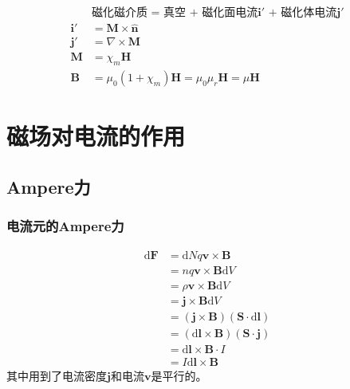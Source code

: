\documentclass[12pt,onecolumn,a4paper]{book}
\newenvironment{block}[1]{
    \begin{tcolorbox}[colback=blue!5!white,colframe=blue!75!black,title=#1]
}{
    \end{tcolorbox}
}
\numberwithin{table}{subsection}
\numberwithin{equation}{subsection}
\begin{document}
\begin{block}{磁介质}
    \begin{align}
                    & \text{磁化磁介质 = 真空 + 磁化面电流$\mathbf{i}'$ + 磁化体电流$\mathbf{j}'$}             \\
        \mathbf{i}' & = \mathbf{M} \times \hat{\mathbf{n}}                                    \\
        \mathbf{j}' & = \nabla \times \mathbf{M}                                              \\
        \mathbf{M}  & = \chi_m \mathbf{H}                                                     \\
        \mathbf{B}  & = \mu_0 (1+\chi_m) \mathbf{H} = \mu_0 \mu_r \mathbf{H} = \mu \mathbf{H}
    \end{align}
\end{block}

\newpage

\section{磁场对电流的作用}

\subsection{Ampere力}

\subsubsection{电流元的Ampere力}

\begin{align}
    \mathrm{d} \mathbf{F} & = \mathrm{d} N q \mathbf{v} \times \mathbf{B}                             \\
                          & =  n q \mathbf{v} \times \mathbf{B} \mathrm{d} V                          \\
                          & = \rho \mathbf{v} \times \mathbf{B} \mathrm{d} V                          \\
                          & = \mathbf{j} \times \mathbf{B} \mathrm{d} V                               \\
                          & = (\mathbf{j} \times \mathbf{B})( \mathbf{S} \cdot \mathrm{d} \mathbf{l}) \\
                          & = (\mathrm{d} \mathbf{l} \times \mathbf{B})  (\mathbf{S}\cdot \mathbf{j}) \\
                          & = \mathrm{d} \mathbf{l} \times \mathbf{B}\cdot I                          \\
                          & = I \mathrm{d} \mathbf{l} \times \mathbf{B}
\end{align}
其中用到了电流密度$\mathbf{j}$和电流$ \mathbf{v}$是平行的。
\end{document}
